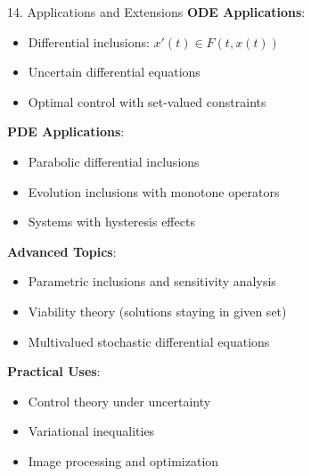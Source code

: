 \documentclass[aspectratio=169,10pt]{beamer}
\begin{document}
\begin{frame}[allowframebreaks]{14. Applications and Extensions}
    \textbf{ODE Applications}:
    \begin{itemize}
        \item Differential inclusions: $x'(t) \in F(t, x(t))$
        \item Uncertain differential equations
        \item Optimal control with set-valued constraints
    \end{itemize}

    \vspace{0.3cm}
    \textbf{PDE Applications}:
    \begin{itemize}
        \item Parabolic differential inclusions
        \item Evolution inclusions with monotone operators
        \item Systems with hysteresis effects
    \end{itemize}

    \vspace{0.3cm}
    \textbf{Advanced Topics}:
    \begin{itemize}
        \item Parametric inclusions and sensitivity analysis
        \item Viability theory (solutions staying in given set)
        \item Multivalued stochastic differential equations
    \end{itemize}

    \vspace{0.3cm}
    \textbf{Practical Uses}:
    \begin{itemize}
        \item Control theory under uncertainty
        \item Variational inequalities
        \item Image processing and optimization
    \end{itemize}
\end{frame}
\end{document}
